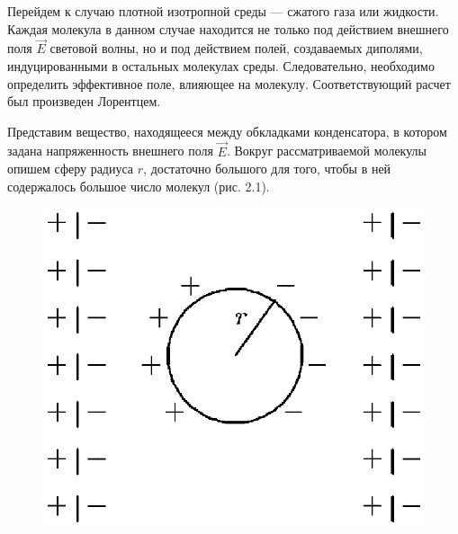 Перейдем к случаю плотной изотропной среды --- сжатого газа или
жидкости. Каждая молекула в данном случае находится не только под
действием внешнего поля $\vec E$ световой волны, но и под
действием полей, создаваемых диполями, индуцированными в остальных
молекулах среды. Следовательно, необходимо определить эффективное
поле, влияющее на молекулу. Соответствующий расчет был произведен
Лорентцем.

Представим вещество, находящееся между обкладками конденсатора, в
котором задана напряженность внешнего поля $\vec E$. Вокруг
рассматриваемой молекулы опишем сферу радиуса $r$, достаточно
большого для того, чтобы в ней содержалось большое число молекул
(рис. 2.1).

\begin{figure}[tbp]
\centerline{\hbox{\includegraphics[scale=0.7]{Ris/ris_eps/ris2_01.eps}}}

\end{figure}

